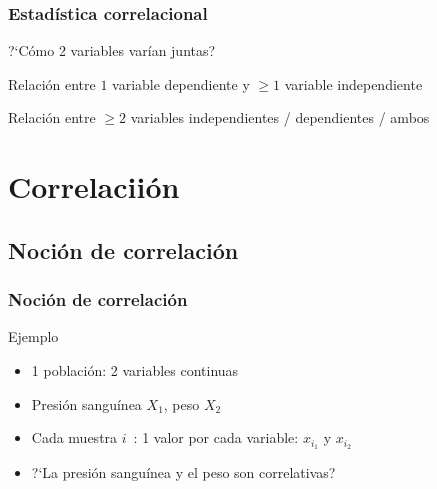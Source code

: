 \documentclass[mathserif]{beamer}
\begin{document}
\begin{frame}[label=corroverv2]
   \frametitle{Estad\'istica correlacional}
   \begin{description}[---------------------------]
       \item[Correlaci\'on:] ?`C\'omo 2 variables var\'ian juntas?
       \item[Regresi\'on:] Relaci\'on entre $1$ variable dependiente y $\geq 1$ variable independiente
       \item[An\'alisis multivariados:] Relaci\'on entre $\geq 2$ variables independientes / dependientes / ambos 
   \end{description}
\end{frame}%



\section{Correlacii\'on}
 
\subsection[Noci\'on de correlaci\'on]{Noci\'on de correlaci\'on}

\begin{frame}[label=introcorr1]
   \frametitle{Noci\'on de correlaci\'on}
    \begin{exampleblock}{Ejemplo}
       \begin{itemize}
          \item 1 poblaci\'on: 2 variables continuas 
          \item Presi\'on sangu\'inea $X_1$, peso $X_2$
          \item Cada muestra $i$~: 1 valor por cada variable: $x_{i_1}$ y $x_{i_2}$
       \end{itemize}
    \end{exampleblock}
    \begin{itemize}[<+-| handout:1>]
      \item ?`La presi\'on sangu\'inea y el peso son correlativas?
   \end{itemize}
\end{frame}%
\end{document}
